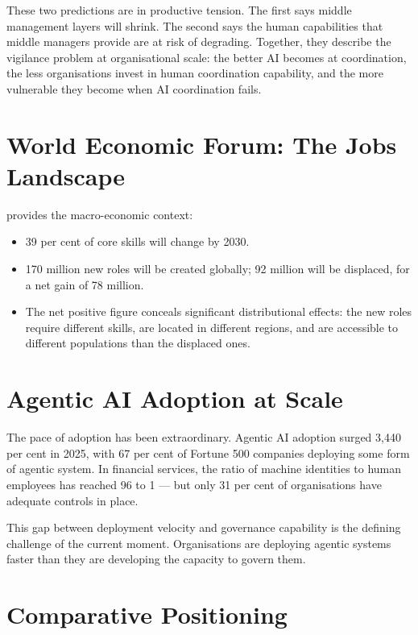 These two predictions are in productive tension. The first says middle management layers will shrink. The second says the human capabilities that middle managers provide are at risk of degrading. Together, they describe the vigilance problem at organisational scale: the better AI becomes at coordination, the less organisations invest in human coordination capability, and the more vulnerable they become when AI coordination fails.

\section{World Economic Forum: The Jobs Landscape}

\textcite{WEF2025} provides the macro-economic context:

\begin{itemize}
  \item 39 per cent of core skills will change by 2030.
  \item 170 million new roles will be created globally; 92 million will be displaced, for a net gain of 78 million.
  \item The net positive figure conceals significant distributional effects: the new roles require different skills, are located in different regions, and are accessible to different populations than the displaced ones.
\end{itemize}

\section{Agentic AI Adoption at Scale}

The pace of adoption has been extraordinary. Agentic AI adoption surged 3,440 per cent in 2025, with 67 per cent of Fortune 500 companies deploying some form of agentic system. In financial services, the ratio of machine identities to human employees has reached 96 to 1 \parencite{CyberArk2025} --- but only 31 per cent of organisations have adequate controls in place.

This gap between deployment velocity and governance capability is the defining challenge of the current moment. Organisations are deploying agentic systems faster than they are developing the capacity to govern them.

\section{Comparative Positioning}

